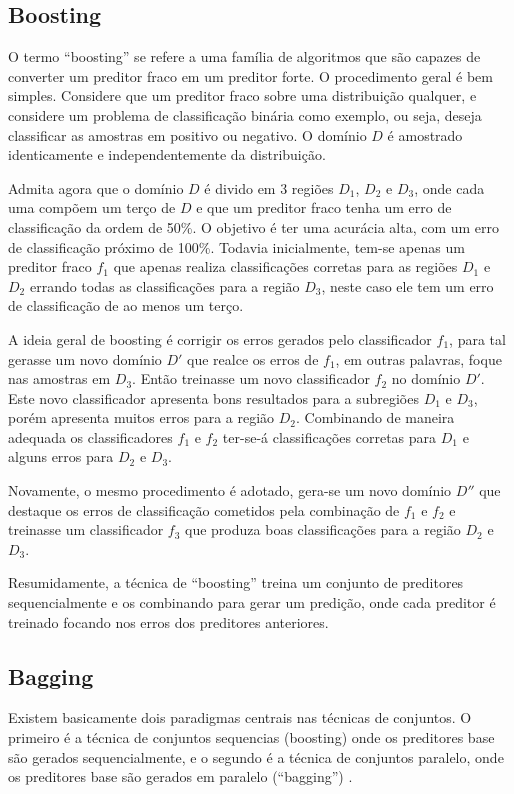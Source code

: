 \subsection{Boosting}

O termo ``boosting'' se refere a uma família de algoritmos que são capazes de converter um preditor fraco em um preditor forte. O procedimento geral é bem simples. Considere que um preditor fraco sobre uma distribuição qualquer, e considere um problema de classificação binária como exemplo, ou seja, deseja classificar as amostras em positivo ou negativo. O domínio $D$ é amostrado identicamente e independentemente da distribuição.

Admita agora que o domínio $D$ é divido em 3 regiões $D_1$, $D_2$ e $D_3$, onde cada uma compõem um terço de $D$ e que um preditor fraco tenha um erro de classificação da ordem de 50\%. O objetivo é ter uma acurácia alta, com um erro de classificação próximo de 100\%. Todavia inicialmente, tem-se apenas um preditor fraco $f_1$ que apenas realiza classificações corretas para as regiões $D_1$ e $D_2$ errando todas as classificações para a região $D_3$, neste caso ele tem um erro de classificação de ao menos um terço.

A ideia geral de boosting é corrigir os erros gerados pelo classificador $f_1$, para tal gerasse um novo domínio $D'$ que realce os erros de $f_1$, em outras palavras, foque nas amostras em $D_3$. Então treinasse um novo classificador $f_2$  no domínio $D'$. Este novo classificador apresenta bons resultados para a subregiões $D_1$ e $D_3$, porém apresenta muitos erros para a região $D_2$. Combinando de maneira adequada os classificadores $f_1$ e $f_2$ ter-se-á classificações corretas para $D_1$ e alguns erros para $D_2$ e $D_3$.

Novamente, o mesmo procedimento é adotado, gera-se um novo domínio $D''$ que destaque os erros de classificação cometidos pela combinação de $f_1$ e $f_2$ e treinasse um classificador $f_3$ que produza boas classificações para a região $D_2$ e $D_3$.

Resumidamente, a técnica de ``boosting'' treina um conjunto de preditores sequencialmente e os combinando para gerar um predição, onde cada preditor é treinado focando nos erros dos preditores anteriores.

\subsection{Bagging}

Existem basicamente dois paradigmas centrais nas técnicas de conjuntos. O primeiro é a técnica de conjuntos sequencias (boosting) onde os preditores base são gerados sequencialmente, e o segundo é a técnica de conjuntos paralelo, onde os preditores base são gerados em paralelo (``bagging'') \cite{BREIMAN:1996}.

